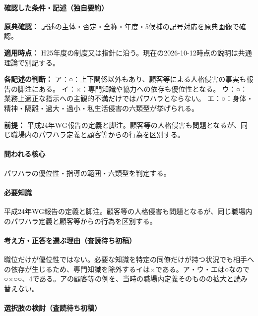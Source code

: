 \paragraph{確認した条件・記述（独自要約）}\mbox{}\par

\noindent\textbf{原典確認：} 記述の主体・否定・全称・年度・5候補の記号対応を原典画像で確認。\par

\noindent\textbf{適用時点：} H25年度の制度又は指針に沿う。現在の2026-10-12時点の説明は共通理論で別記する。\par

\noindent\textbf{各記述の判断：} ア：○：上下関係以外もあり、顧客等による人格侵害の事実も報告の脚注にある。 イ：×：専門知識や協力への依存も優位性となる。 ウ：○：業務上適正な指示への主観的不満だけではパワハラとならない。 エ：○：身体・精神・隔離・過大・過小・私生活侵害の六類型が挙げられる。\par

\noindent\textbf{前提：} 平成24年WG報告の定義と脚注。顧客等の人格侵害も問題となるが、同じ職場内のパワハラ定義と顧客等からの行為を区別する。\par

\paragraph{問われる核心} パワハラの優位性・指導の範囲・六類型を判定する。

\paragraph{必要知識} 平成24年WG報告の定義と脚注。顧客等の人格侵害も問題となるが、同じ職場内のパワハラ定義と顧客等からの行為を区別する。

\paragraph{考え方・正答を選ぶ理由（査読待ち初稿）} 職位だけが優位性ではない。必要な知識を特定の同僚だけが持つ状況でも相手への依存が生じるため、専門知識を除外するイは×である。ア・ウ・エは○なので○×○○、4である。アの顧客等の例を、当時の職場内定義そのものの拡大と読み替えない。

\paragraph{選択肢の検討（査読待ち初稿）}\mbox{}\par

